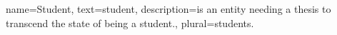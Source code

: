 {
	name=Student,
	text=student,
	description={is an entity needing a thesis to transcend the state of being a student.},
	plural=students.
}